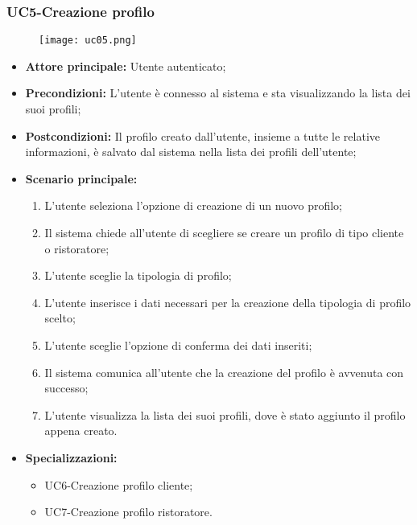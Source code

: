 \pagebreak
\subsubsection{UC5-Creazione profilo}
\begin{figure}[h] \texttt{[image: uc05.png]} \end{figure}
\begin{itemize}
    \item \textbf{Attore principale:} Utente autenticato;
    \item \textbf{Precondizioni:} L'utente è connesso al sistema e sta visualizzando la lista dei suoi profili;
    \item \textbf{Postcondizioni:} Il profilo creato dall'utente, insieme a tutte le relative informazioni, è salvato dal sistema nella lista dei profili dell'utente;
    \item \textbf{Scenario principale:}
    \begin{enumerate}
        \item L'utente seleziona l'opzione di creazione di un nuovo profilo;
        \item Il sistema chiede all'utente di scegliere se creare un profilo di tipo cliente o ristoratore;
        \item L'utente sceglie la tipologia di profilo;
        \item L'utente inserisce i dati necessari per la creazione della tipologia di profilo scelto;
        \item L'utente sceglie l'opzione di conferma dei dati inseriti;
        \item Il sistema comunica all'utente che la creazione del profilo è avvenuta con successo;
        \item L'utente visualizza la lista dei suoi profili, dove è stato aggiunto il profilo appena creato.
    \end{enumerate}
    \item \textbf{Specializzazioni:}
        \begin{itemize}
            \item UC6-Creazione profilo cliente;
            \item UC7-Creazione profilo ristoratore.
        \end{itemize}
\end{itemize}

